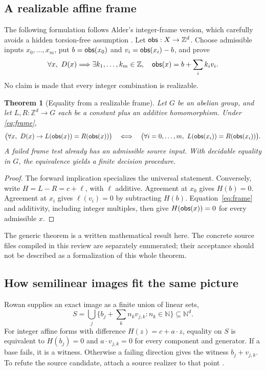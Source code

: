 \documentclass[11pt,letterpaper]{article}
\newcommand{\N}{\mathbb N}\newcommand{\Z}{\mathbb Z}
\newtheorem{theorem}[proposition]{Theorem}
\theoremstyle{definition}\newtheorem{definition}[proposition]{Definition}
\theoremstyle{remark}\newtheorem{remark}[proposition]{Remark}
\begin{document}
\subsection{A realizable affine frame}

The following formulation follows Alder's integer-frame version, which
carefully avoids a hidden torsion-free assumption \cite{alder}.
Let $\obs:X\to\Z^d$. Choose admissible inputs $x_0,\ldots,x_m$, put
$b=\mathsf{obs}(x_0)$ and $v_i=\mathsf{obs}(x_i)-b$, and prove
\begin{equation}\label{eq:frame}
 \forall x,\ D(x)\Longrightarrow
 \exists k_1,\ldots,k_m\in\Z,\quad
 \obs(x)=b+\sum_i k_i v_i.
\end{equation}
No claim is made that every integer combination is realizable.

\begin{theorem}[Equality from a realizable frame]\label{thm:frame}
Let $G$ be an abelian group, and let $L,R:\Z^d\to G$ each be a constant
plus an additive homomorphism. Under \eqref{eq:frame},
\[
 \bigl(\forall x,\ D(x)\to L(\mathsf{obs}(x))=R(\mathsf{obs}(x))\bigr)
 \quad\Longleftrightarrow\quad
 \bigl(\forall i=0,\ldots,m,\ L(\mathsf{obs}(x_i))=R(\mathsf{obs}(x_i))\bigr).
\]
A failed frame test already has an admissible source input. With decidable
equality in $G$, the equivalence yields a finite decision procedure.
\end{theorem}
\begin{proof}
The forward implication specializes the universal statement. Conversely,
write $H=L-R=c+\ell$, with $\ell$ additive. Agreement at $x_0$ gives
$H(b)=0$. Agreement at $x_i$ gives $\ell(v_i)=0$ by subtracting $H(b)$.
Equation~\eqref{eq:frame} and additivity, including integer multiples,
then give $H(\mathsf{obs}(x))=0$ for every admissible $x$.
\end{proof}
The generic theorem is a written mathematical result here. The concrete
source files compiled in this review are separately enumerated; their
acceptance should not be described as a formalization of this whole theorem.

\subsection{How semilinear images fit the same picture}

Rowan supplies an exact image as a finite union of linear sets,
\[
 S=\bigcup_j\{b_j+\sum_k n_k v_{j,k}:n_k\in\N\}\subseteq\N^d.
\]
For integer affine forms with difference $H(z)=c+a\cdot z$, equality on
$S$ is equivalent to $H(b_j)=0$ and $a\cdot v_{j,k}=0$ for every component
and generator. If a base fails, it is a witness. Otherwise a failing direction
gives the witness $b_j+v_{j,k}$. To refute the source candidate, attach a
source realizer to that point \cite{rowan}.
\end{document}
